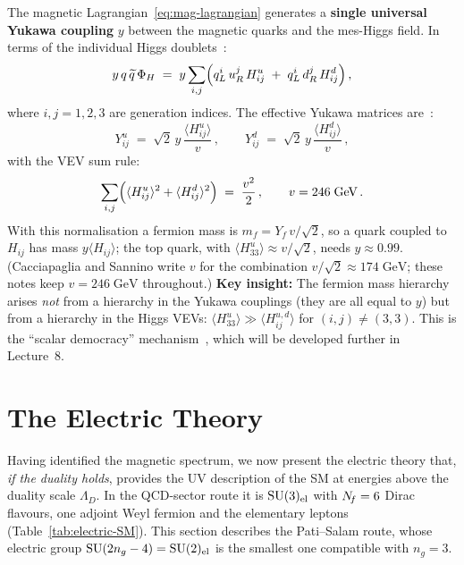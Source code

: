 \documentclass[11pt,a4paper]{article}
\begin{document}
The magnetic Lagrangian~\eqref{eq:mag-lagrangian} generates a
\textbf{single universal Yukawa coupling} $y$ between the magnetic
quarks and the mes-Higgs field.  In terms of the individual Higgs
doublets~\cite{CacciapagliaSannino2024}:
\begin{equation}\label{eq:yukawa}
  y\, q\, \widetilde{q}\, \Phi_H
  \;=\; y \sum_{i,j}
  \Bigl(
    q_L^i\, u_R^j\, H_{ij}^u
    \;+\; q_L^i\, d_R^j\, H_{ij}^d
  \Bigr)\,,
\end{equation}
where $i,j = 1,2,3$ are generation indices.  The effective Yukawa
matrices are~\cite{CacciapagliaSannino2024}:
\begin{equation}\label{eq:eff-yukawa}
  Y_{ij}^u \;=\; \sqrt{2}\, y\, \frac{\langle H_{ij}^u \rangle}{v}\,,
  \qquad
  Y_{ij}^d \;=\; \sqrt{2}\, y\, \frac{\langle H_{ij}^d \rangle}{v}\,,
\end{equation}
with the VEV sum rule:
\begin{equation}\label{eq:vev-sum}
  \sum_{i,j}
  \Bigl(
    \langle H_{ij}^u \rangle^2 + \langle H_{ij}^d \rangle^2
  \Bigr)
  \;=\; \frac{v^2}{2}\,,
  \qquad v = 246\;\text{GeV}\,.
\end{equation}
With this normalisation a fermion mass is $m_f = Y_f\, v/\sqrt{2}$, so a
quark coupled to $H_{ij}$ has mass $y \langle H_{ij} \rangle$; the top
quark, with $\langle H_{33}^u \rangle \approx v/\sqrt{2}$, needs
$y \approx 0.99$.  (Cacciapaglia and Sannino write $v$ for the
combination $v/\sqrt{2} \approx 174\;\text{GeV}$; these notes keep
$v = 246\;\text{GeV}$ throughout.)
\textbf{Key insight:} The fermion mass hierarchy arises \emph{not} from
a hierarchy in the Yukawa couplings (they are all equal to $y$) but
from a hierarchy in the Higgs VEVs:
$\langle H_{33}^u \rangle \gg \langle H_{ij}^{u,d} \rangle$ for
$(i,j) \neq (3,3)$.  This is the ``scalar democracy''
mechanism~\cite{HillMachado2019}, which will be developed further in
Lecture~8.


\section{The Electric Theory}
\label{sec:electric-theory}

Having identified the magnetic spectrum, we now present the electric
theory that, \emph{if the duality holds}, provides the UV
description of the SM at energies above the duality scale $\Lambda_D$.
In the QCD-sector route it is $\mathrm{SU}(3)_{\mathrm{el}}$ with $N_{\!f} = 6$
Dirac flavours, one adjoint Weyl fermion and the elementary leptons
(Table~\ref{tab:electric-SM}).  This section describes the Pati--Salam
route, whose electric group $\mathrm{SU}(2n_g - 4) = \mathrm{SU}(2)_{\mathrm{el}}$ is
the smallest one compatible with $n_g = 3$.
\end{document}

